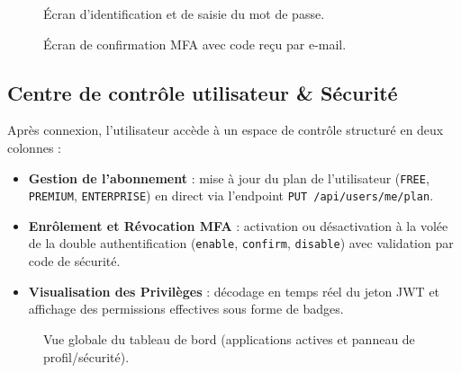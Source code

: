 \documentclass[11pt,a4paper,oneside]{report}
\newcommand{\code}[1]{\texttt{\small #1}}
\begin{document}
\begin{figure}[h]
  \centering
  \caption{Écran d'identification et de saisie du mot de passe.}
  \label{fig:poc-login-steps}
\end{figure}

\begin{figure}[h]
  \centering
  \caption{Écran de confirmation MFA avec code reçu par e-mail.}
  \label{fig:poc-login-mfa}
\end{figure}

\subsection{Centre de contrôle utilisateur & Sécurité}
Après connexion, l'utilisateur accède à un espace de contrôle structuré en deux colonnes :
\begin{itemize}
  \item \textbf{Gestion de l'abonnement} : mise à jour du plan de l'utilisateur (\code{FREE}, \code{PREMIUM}, \code{ENTERPRISE}) en direct via l'endpoint \code{PUT /api/users/me/plan}.
  \item \textbf{Enrôlement et Révocation MFA} : activation ou désactivation à la volée de la double authentification (\code{enable}, \code{confirm}, \code{disable}) avec validation par code de sécurité.
  \item \textbf{Visualisation des Privilèges} : décodage en temps réel du jeton JWT et affichage des permissions effectives sous forme de badges.
\end{itemize}

\begin{figure}[h]
  \centering
  \caption{Vue globale du tableau de bord (applications actives et panneau de profil/sécurité).}
  \label{fig:poc-dashboard}
\end{figure}
\end{document}

